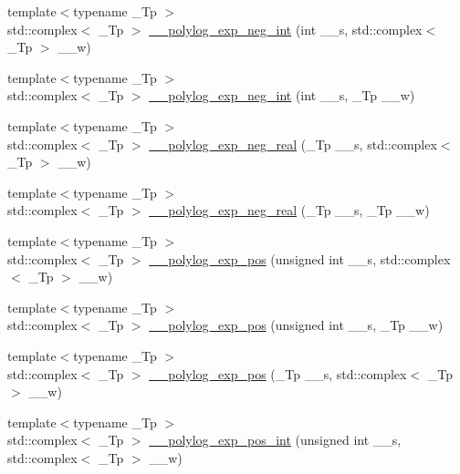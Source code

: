 \begin{DoxyCompactItemize}
\item 
{\footnotesize template$<$typename \+\_\+\+Tp $>$ }\\std\+::complex$<$ \+\_\+\+Tp $>$ \hyperlink{namespacestd_1_1____detail_a02b154619b2e4d0bf50dc303370d74cd}{\+\_\+\+\_\+polylog\+\_\+exp\+\_\+neg\+\_\+int} (int \+\_\+\+\_\+s, std\+::complex$<$ \+\_\+\+Tp $>$ \+\_\+\+\_\+w)
\item 
{\footnotesize template$<$typename \+\_\+\+Tp $>$ }\\std\+::complex$<$ \+\_\+\+Tp $>$ \hyperlink{namespacestd_1_1____detail_a7a186c84c1673a2beabba25c91119c66}{\+\_\+\+\_\+polylog\+\_\+exp\+\_\+neg\+\_\+int} (int \+\_\+\+\_\+s, \+\_\+\+Tp \+\_\+\+\_\+w)
\item 
{\footnotesize template$<$typename \+\_\+\+Tp $>$ }\\std\+::complex$<$ \+\_\+\+Tp $>$ \hyperlink{namespacestd_1_1____detail_a6320926219e1a9a653d9a793c7a3ad37}{\+\_\+\+\_\+polylog\+\_\+exp\+\_\+neg\+\_\+real} (\+\_\+\+Tp \+\_\+\+\_\+s, std\+::complex$<$ \+\_\+\+Tp $>$ \+\_\+\+\_\+w)
\item 
{\footnotesize template$<$typename \+\_\+\+Tp $>$ }\\std\+::complex$<$ \+\_\+\+Tp $>$ \hyperlink{namespacestd_1_1____detail_a65df07847bbb3c92518449fbc5787870}{\+\_\+\+\_\+polylog\+\_\+exp\+\_\+neg\+\_\+real} (\+\_\+\+Tp \+\_\+\+\_\+s, \+\_\+\+Tp \+\_\+\+\_\+w)
\item 
{\footnotesize template$<$typename \+\_\+\+Tp $>$ }\\std\+::complex$<$ \+\_\+\+Tp $>$ \hyperlink{namespacestd_1_1____detail_a0327d2970eba3a0a2d73c71c7a77701c}{\+\_\+\+\_\+polylog\+\_\+exp\+\_\+pos} (unsigned int \+\_\+\+\_\+s, std\+::complex$<$ \+\_\+\+Tp $>$ \+\_\+\+\_\+w)
\item 
{\footnotesize template$<$typename \+\_\+\+Tp $>$ }\\std\+::complex$<$ \+\_\+\+Tp $>$ \hyperlink{namespacestd_1_1____detail_ab13a4be6685dd222b654da3297342d7e}{\+\_\+\+\_\+polylog\+\_\+exp\+\_\+pos} (unsigned int \+\_\+\+\_\+s, \+\_\+\+Tp \+\_\+\+\_\+w)
\item 
{\footnotesize template$<$typename \+\_\+\+Tp $>$ }\\std\+::complex$<$ \+\_\+\+Tp $>$ \hyperlink{namespacestd_1_1____detail_a56b0f5bc6f4955469fd5f83105cbd466}{\+\_\+\+\_\+polylog\+\_\+exp\+\_\+pos} (\+\_\+\+Tp \+\_\+\+\_\+s, std\+::complex$<$ \+\_\+\+Tp $>$ \+\_\+\+\_\+w)
\item 
{\footnotesize template$<$typename \+\_\+\+Tp $>$ }\\std\+::complex$<$ \+\_\+\+Tp $>$ \hyperlink{namespacestd_1_1____detail_a84081b0dd494f4601f2d40768e71b7b4}{\+\_\+\+\_\+polylog\+\_\+exp\+\_\+pos\+\_\+int} (unsigned int \+\_\+\+\_\+s, std\+::complex$<$ \+\_\+\+Tp $>$ \+\_\+\+\_\+w)

\end{DoxyCompactItemize}
